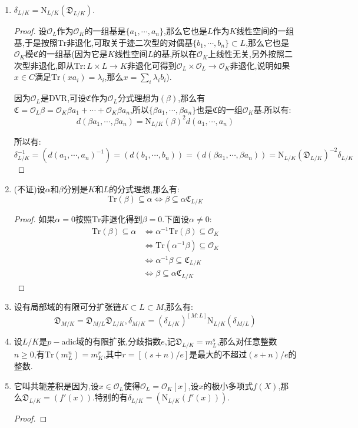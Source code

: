 \begin{enumerate}
	\item $\delta_{L/K}=\mathrm{N}_{L/K}(\mathfrak{D}_{L/K})$.
	\begin{proof}
		
		设$\mathscr{O}_L$作为$\mathscr{O}_K$的一组基是$\{a_1,\cdots,a_n\}$,那么它也是$L$作为$K$线性空间的一组基,于是按照$\mathrm{Tr}$非退化,可取关于迹二次型的对偶基$\{b_1,\cdots,b_n\}\subset L$,那么它也是$\mathscr{O}_K$模$\mathfrak{C}$的一组基(因为它是$K$线性空间$L$的基,所以在$\mathscr{O}_K$上线性无关,另外按照二次型非退化,即从$\mathrm{Tr}:L\times L\to K$非退化可得到$\mathscr{O}_L\times\mathscr{O}_L\to\mathscr{O}_K$非退化,说明如果$x\in C$满足$\mathrm{Tr}(xa_i)=\lambda_i$,那么$x=\sum_i\lambda_ib_i$).
		
		\qquad
		
		因为$\mathscr{O}_L$是DVR,可设$\mathfrak{C}$作为$\mathscr{O}_L$分式理想为$(\beta)$,那么有$\mathfrak{C}=\mathscr{O}_L\beta=\mathscr{O}_K\beta a_1+\cdots+\mathscr{O}_K\beta a_n$,所以$\{\beta a_1,\cdots,\beta a_n\}$也是$\mathfrak{C}$的一组$\mathscr{O}_K$基.所以有:
		$$d(\beta a_1,\cdots,\beta a_n)=\mathrm{N}_{L/K}(\beta)^2d(a_1,\cdots,a_n)$$
		
		所以有:
		$$\delta_{L/K}^{-1}=(d(a_1,\cdots,a_n)^{-1})=(d(b_1,\cdots,b_n))=(d(\beta a_1,\cdots,\beta a_n))=\mathrm{N}_{L/K}(\mathfrak{D}_{L/K})^{-2}\delta_{L/K}$$
	\end{proof}
	\item (不证)设$\alpha$和$\beta$分别是$K$和$L$的分式理想,那么有:
	$$\mathrm{Tr}(\beta)\subseteq\alpha\Leftrightarrow\beta\subseteq\alpha\mathfrak{C}_{L/K}$$
	\begin{proof}
		
		如果$\alpha=0$按照$\mathrm{Tr}$非退化得到$\beta=0$.下面设$\alpha\not=0$:
		\begin{align*}
			\mathrm{Tr}(\beta)\subseteq\alpha&\Leftrightarrow\alpha^{-1}\mathrm{Tr}(\beta)\subseteq\mathscr{O}_K\\&\Leftrightarrow\mathrm{Tr}(\alpha^{-1}\beta)\subseteq\mathscr{O}_K\\&\Leftrightarrow\alpha^{-1}\beta\subseteq\mathfrak{C}_{L/K}\\&\Leftrightarrow\beta\subseteq\alpha\mathfrak{C}_{L/K}
		\end{align*}
	\end{proof}
	\item 设有局部域的有限可分扩张链$K\subset L\subset M$,那么有:
	$$\mathfrak{D}_{M/K}=\mathfrak{D}_{M/L}\mathfrak{D}_{L/K},\delta_{M/K}=(\delta_{L/K})^{[M:L]}\mathrm{N}_{L/K}(\delta_{M/L})$$
	\item 设$L/K$是$p-$adic域的有限扩张,分歧指数$e$,记$\mathfrak{D}_{L/K}=m_L^s$,那么对任意整数$n\ge0$,有$\mathrm{Tr}(m_L^n)=m_K^r$,其中$r=[(s+n)/e]$是最大的不超过$(s+n)/e$的整数.
	\item 它叫共轭差积是因为,设$x\in\mathscr{O}_L$使得$\mathscr{O}_L=\mathscr{O}_K[x]$,设$x$的极小多项式$f(X)$,那么$\mathfrak{D}_{L/K}=(f'(x))$.特别的有$\delta_{L/K}=(\mathrm{N}_{L/K}(f'(x)))$.
	\begin{proof}
		

\end{proof}
\end{enumerate}
